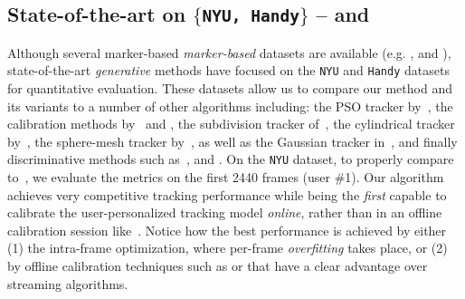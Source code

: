 
\subsection{State-of-the-art on $\{$\texttt{NYU, Handy}$\}$ --
 and }
\label{sec:evalstar}
Although several marker-based \emph{marker-based} datasets are available (e.g. \cite{qian2014realtime}, \cite{sharp2015accurate} and \cite{yuan2017bighand}), state-of-the-art \emph{generative} methods have focused on the \texttt{NYU} \cite{tompson2014real} and \texttt{Handy} \cite{tkach2016sphere} datasets for quantitative evaluation. These datasets allow us to compare our method and its variants to a number of other algorithms including: the PSO tracker by~\cite{sharp2015accurate}, the calibration methods by~\cite{khamis2015learning} and \cite{tan2016fits}, the subdivision tracker of~\cite{taylor2016joint}, the cylindrical tracker by~\cite{htrack}, the sphere-mesh tracker by~\cite{tkach2016sphere}, as well as the Gaussian tracker in~\cite{sridhar2015fast}, and finally discriminative methods such as~\cite{tompson2014real}, \cite{tang2015opening} and \cite{oberweger2015hands}. 
% 
On the \texttt{NYU} dataset, to properly compare to~\cite{taylor2016joint}, we evaluate the metrics on the first 2440 frames (user \#1). Our algorithm achieves very competitive tracking performance while being the \emph{first} capable to calibrate the user-personalized tracking model \emph{online}, rather than in an offline calibration session like~\cite{taylor2016joint}. 
% 
Notice how the best performance is achieved by either (1) the intra-frame optimization, where per-frame \emph{overfitting} takes place, or (2) by offline calibration techniques such as \OfflineSoft{} or \cite{taylor2016joint} that have a clear advantage over streaming algorithms.





